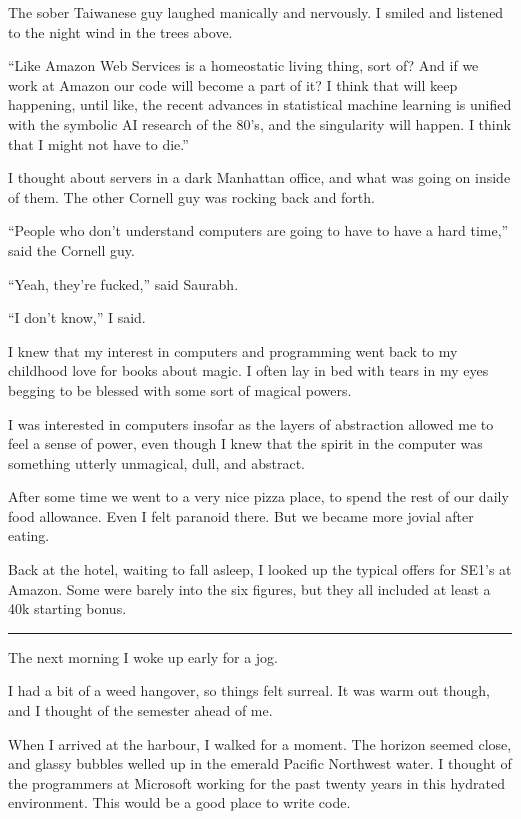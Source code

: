 The sober Taiwanese guy laughed manically and nervously.  I smiled and listened
to the night wind in the trees above.

``Like Amazon Web Services is a homeostatic living thing, sort of?  And if we
work at Amazon our code will become a part of it?  I think that will keep
happening, until like, the recent advances in statistical machine learning is
unified with the symbolic AI research of the 80's, and the singularity will
happen.  I think that I might not have to die.''

I thought about servers in a dark Manhattan office, and what was going on inside
of them.  The other Cornell guy was rocking back and forth.

``People who don't understand computers are going to have to have a hard time,''
said the Cornell guy.

``Yeah, they're fucked,'' said Saurabh.

``I don't know,'' I said.

I knew that my interest in computers and programming went back to my childhood
love for books about magic.  I often lay in bed with tears in my eyes begging to
be blessed with some sort of magical powers. 

I was interested in computers insofar as the layers of abstraction allowed me to
feel a sense of power, even though I knew that the spirit in the computer was
something utterly unmagical, dull, and abstract. 

After some time we went to a very nice pizza place, to spend the rest of our
daily food allowance.   Even I felt paranoid there.  But we became more jovial
after eating.  

Back at the hotel, waiting to fall asleep, I looked up the typical offers for
SE1's at Amazon.  Some were barely into the six figures, but they all included
at least a 40k starting bonus.

\plainfancybreak{12pt}{2}{* * *}

The next morning I woke up early for a jog.

I had a bit of a weed hangover, so things felt surreal.  It was warm out though,
and I thought of the semester ahead of me.

When I arrived at the harbour, I walked for a moment.  The horizon seemed close,
and glassy bubbles welled up in the emerald Pacific Northwest water.  I thought
of the programmers at Microsoft working for the past twenty years in this
hydrated environment.  This would be a good place to write code.

